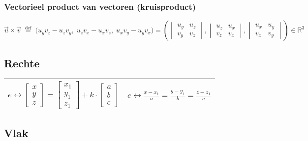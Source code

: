\documentclass[a5paper]{article}
\begin{document}
\subsubsection{Vectorieel product van vectoren (kruisproduct)}
\[
\vec{u} \times \vec{v}
\;\stackrel{\text{def}}{=}\;
\bigl(u_y v_z - u_z v_y,\;
u_z v_x - u_x v_z,\;
u_x v_y - u_y v_x \bigr)
=\left(
\begin{vmatrix}
u_y & u_z\\
v_y & v_z
\end{vmatrix},
\begin{vmatrix}
u_z & u_x\\
v_z & v_x
\end{vmatrix},
\begin{vmatrix}
u_x & u_y\\
v_x & v_y
\end{vmatrix}
\right) \in \mathbb{R}^3
\]

\newpage

\subsection{Rechte}

\begin{table}[h!]
\centering
\begin{tabular}{|c|c|}
\hline
{\small $e \leftrightarrow
\begin{bmatrix}
x \\
y \\
z
\end{bmatrix}
=
\begin{bmatrix}
x_1 \\
y_1 \\
z_1
\end{bmatrix}
+ k \cdot
\begin{bmatrix}
a \\
b \\
c
\end{bmatrix}
$}
&
$e \leftrightarrow
\frac{x - x_1}{a}
=
\frac{y - y_1}{b}
=
\frac{z - z_1}{c}
$ \\
\hline
\end{tabular}
\end{table}

\subsection{Vlak}
\end{document}
